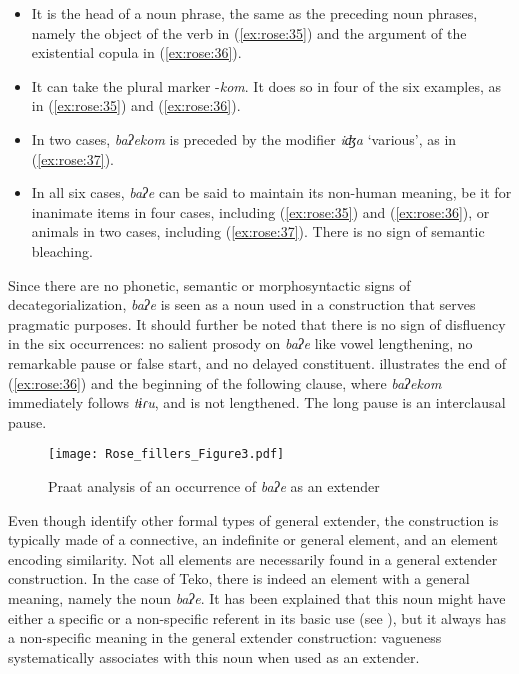 \documentclass[output=paper]{langscibook}
\begin{document}
\begin{itemize}
\item It is the head of a noun phrase, the same as the preceding noun phrases, namely the object of the verb in (\ref{ex:rose:35}) and the argument of the existential copula in (\ref{ex:rose:36}).
\item It can take the plural marker -\textit{kom}. It does so in four of the six examples, as in (\ref{ex:rose:35}) and (\ref{ex:rose:36}).
\item In two cases, \textit{baʔekom} is preceded by the modifier \textit{iʤa} ‘various’, as in (\ref{ex:rose:37}).
\item In all six cases, \textit{baʔe} can be said to maintain its non-human meaning, be it for inanimate items in four cases, including (\ref{ex:rose:35}) and (\ref{ex:rose:36}), or animals in two cases, including (\ref{ex:rose:37}). There is no sign of semantic bleaching.
\end{itemize}

Since there are no phonetic, semantic or morphosyntactic signs of decategorialization, \textit{baʔe} is seen as a noun used in a construction that serves pragmatic purposes. It should further be noted that there is no sign of disfluency in the six occurrences: no salient prosody on \textit{baʔe} like vowel lengthening, no remarkable pause or false start, and no delayed constituent.  illustrates the end of (\ref{ex:rose:36}) and the beginning of the following clause, where \textit{baʔekom} immediately follows \textit{tɨɾu}, and is not lengthened. The long pause is an interclausal pause.

\begin{figure}
\texttt{[image: Rose\_fillers\_Figure3.pdf]}
\caption{\label{fig:rose:3}Praat analysis of an occurrence of \textit{baʔe} as an extender}
\end{figure} 

Even though \citet[65--66]{MauriMauri2017} identify other formal types of general extender, the construction is typically made of a connective, an indefinite or general element, and an element encoding similarity. Not all elements are necessarily found in a general extender construction. In the case of Teko, there is indeed an element with a general meaning, namely the noun \textit{baʔe}. It has been explained that this noun might have either a specific or a non-specific referent in its basic use (see ), but it always has a non-specific meaning in the general extender construction: vagueness systematically associates with this noun when used as an extender.
\end{document}
